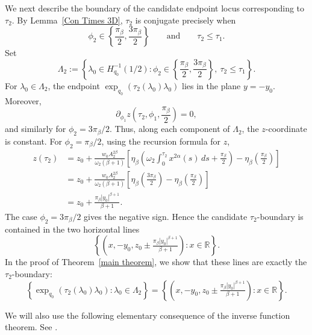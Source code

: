 \documentclass[12pt]{amsart}
\numberwithin{equation}{section}
\theoremstyle{plain}
\theoremstyle{definition}
\theoremstyle{remark}
\begin{document}
We next describe the boundary of the candidate endpoint locus corresponding to
\(\tau_2\). By Lemma~\ref{Con Times 3D}, \(\tau_2\) is conjugate precisely when
\[
    \phi_2\in
    \left\{
    \frac{\pi_\beta}{2},
    \frac{3\pi_\beta}{2}
    \right\}
    \qquad\text{and}\qquad
    \tau_2\leq\tau_1.
\]
Set
\[
    \Lambda_2
    :=
    \left\{
    \lambda_0\in H_{q_0}^{-1}(1/2):
    \phi_2\in
    \left\{
    \frac{\pi_\beta}{2},
    \frac{3\pi_\beta}{2}
    \right\},
    \ \tau_2\leq\tau_1
    \right\}.
\]
For \(\lambda_0\in\Lambda_2\), the endpoint
\(\exp_{q_0}(\tau_2(\lambda_0)\lambda_0)\) lies in the plane \(y=-y_0\). Moreover,
\[
    \partial_{\phi_1}z
    \left(
    \tau_2,\phi_1,\frac{\pi_\beta}{2}
    \right)
    =
    0,
\]
and similarly for \(\phi_2=3\pi_\beta/2\). Thus, along each component of \(\Lambda_2\),
the \(z\)-coordinate is constant. For \(\phi_2=\pi_\beta/2\), using the recursion formula
for \(z\),
\[
    \begin{aligned}
        z(\tau_2)
         & =
        z_0+
        \frac{w_0A_2^{2\beta}}{\omega_2(\beta+1)}
        \left[
            \eta_\beta
            \left(
            \omega_2\int_0^{\tau_2}x^{2\alpha}(s)\,ds+\frac{\pi_\beta}{2}
            \right)
            -
            \eta_\beta\left(\frac{\pi_\beta}{2}\right)
            \right]
        \\
         & =
        z_0+
        \frac{w_0A_2^{2\beta}}{\omega_2(\beta+1)}
        \left[
            \eta_\beta\left(\frac{3\pi_\beta}{2}\right)
            -
            \eta_\beta\left(\frac{\pi_\beta}{2}\right)
            \right]
        \\
         & =
        z_0+
        \frac{\pi_\beta |y_0|^{\beta+1}}{\beta+1}.
    \end{aligned}
\]
The case \(\phi_2=3\pi_\beta/2\) gives the negative sign. Hence the candidate
\(\tau_2\)-boundary is contained in the two horizontal lines
\[
    \left\{
    (x,-y_0,z_0\pm
    \tfrac{\pi_\beta |y_0|^{\beta+1}}{\beta+1})
    :
    x\in\mathbb R
    \right\}.
\]
In the proof of Theorem~\ref{main theorem}, we show that these lines are exactly the
\(\tau_2\)-boundary:
\[
    \left\{
    \exp_{q_0}(\tau_2(\lambda_0)\lambda_0):
    \lambda_0\in\Lambda_2
    \right\}
    =
    \left\{
    (x,-y_0,z_0\pm
    \tfrac{\pi_\beta |y_0|^{\beta+1}}{\beta+1})
    :
    x\in\mathbb R
    \right\}.
\]

We will also use the following elementary consequence of the inverse function theorem. See \cite{LeeBook2003SmoothManifold}.
\end{document}
